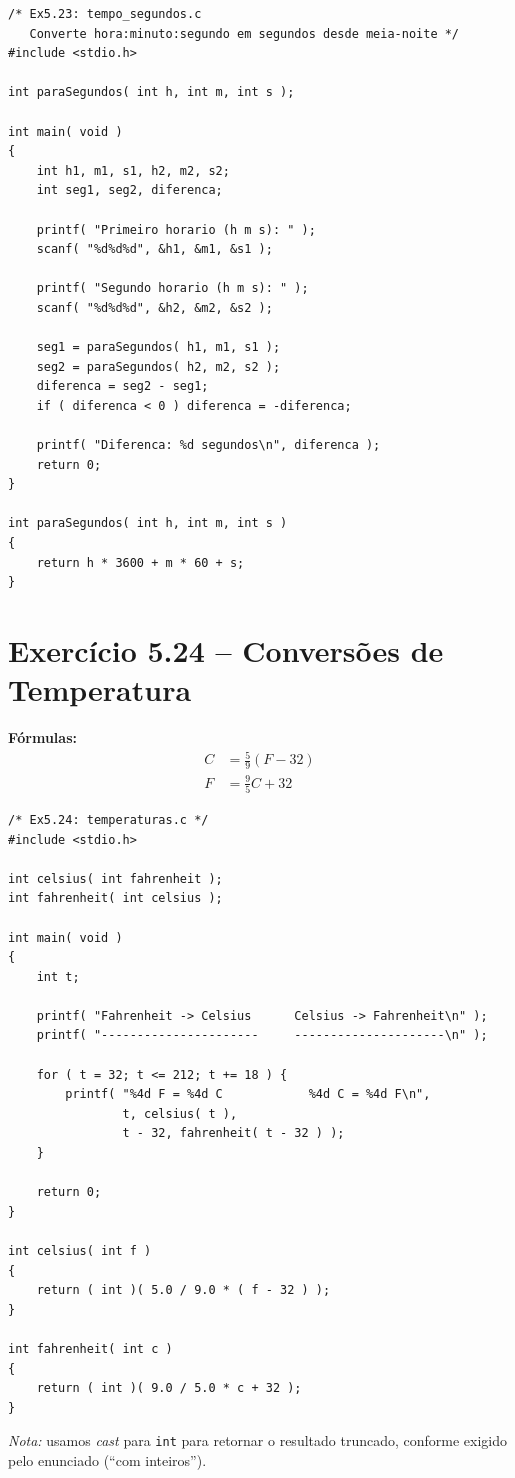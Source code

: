 \documentclass[12pt,a4paper]{article}
\begin{document}
\begin{respostabox}
\begin{lstlisting}
/* Ex5.23: tempo_segundos.c
   Converte hora:minuto:segundo em segundos desde meia-noite */
#include <stdio.h>

int paraSegundos( int h, int m, int s );

int main( void )
{
    int h1, m1, s1, h2, m2, s2;
    int seg1, seg2, diferenca;

    printf( "Primeiro horario (h m s): " );
    scanf( "%d%d%d", &h1, &m1, &s1 );

    printf( "Segundo horario (h m s): " );
    scanf( "%d%d%d", &h2, &m2, &s2 );

    seg1 = paraSegundos( h1, m1, s1 );
    seg2 = paraSegundos( h2, m2, s2 );
    diferenca = seg2 - seg1;
    if ( diferenca < 0 ) diferenca = -diferenca;

    printf( "Diferenca: %d segundos\n", diferenca );
    return 0;
}

int paraSegundos( int h, int m, int s )
{
    return h * 3600 + m * 60 + s;
}
\end{lstlisting}
\end{respostabox}

\section{Exercício 5.24 -- Conversões de Temperatura}

\begin{respostabox}
\textbf{Fórmulas:}
\begin{align*}
  C &= \frac{5}{9}(F - 32) \\
  F &= \frac{9}{5}C + 32
\end{align*}

\begin{lstlisting}
/* Ex5.24: temperaturas.c */
#include <stdio.h>

int celsius( int fahrenheit );
int fahrenheit( int celsius );

int main( void )
{
    int t;

    printf( "Fahrenheit -> Celsius      Celsius -> Fahrenheit\n" );
    printf( "----------------------     ---------------------\n" );

    for ( t = 32; t <= 212; t += 18 ) {
        printf( "%4d F = %4d C            %4d C = %4d F\n",
                t, celsius( t ),
                t - 32, fahrenheit( t - 32 ) );
    }

    return 0;
}

int celsius( int f )
{
    return ( int )( 5.0 / 9.0 * ( f - 32 ) );
}

int fahrenheit( int c )
{
    return ( int )( 9.0 / 5.0 * c + 32 );
}
\end{lstlisting}

\textit{Nota:} usamos \textit{cast} para \texttt{int} para retornar o resultado
truncado, conforme exigido pelo enunciado (``com inteiros'').
\end{respostabox}
\end{document}
